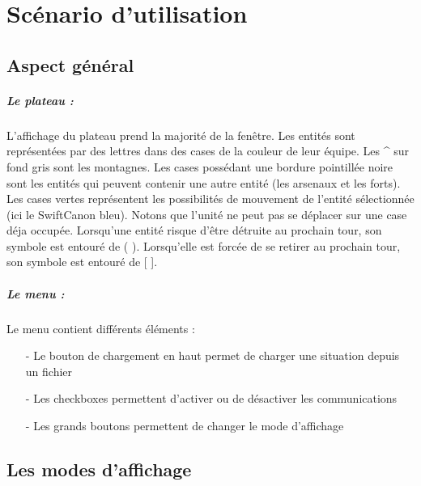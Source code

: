 \chapter{Scénario d'utilisation}

	\section{Aspect général}


		\paragraph{Le plateau :}
			L'affichage du plateau prend la majorité de la fenêtre.
			Les entités sont représentées par des lettres dans des cases de la couleur de leur équipe.
			Les \^{} sur fond gris sont les montagnes.
			Les cases possédant une bordure pointillée noire sont les entités qui peuvent contenir une autre entité	(les arsenaux et les forts).
			Les cases vertes représentent les possibilités de mouvement	de l'entité sélectionnée (ici le SwiftCanon bleu). 
			Notons que l'unité ne peut pas se déplacer sur une case déja occupée.
			Lorsqu'une entité risque d'être détruite au prochain tour, son symbole est entouré de ( ).
			Lorsqu'elle est forcée de se retirer au prochain tour, son symbole est entouré de [ ].
	
		\paragraph{Le menu :}
	
			Le menu contient différents éléments :
			\begin{itemize}
			\item[-]Le bouton de chargement en haut permet de charger une situation depuis un fichier
			\item[-]Les checkboxes permettent d'activer ou de désactiver les communications
			\item[-]Les grands boutons permettent de changer le mode d'affichage
			\end{itemize}

	\section{Les modes d'affichage}

